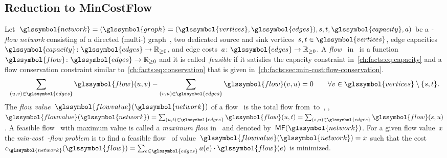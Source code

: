 \subsection{Reduction to MinCostFlow}
\label{ch:facts:sec:model-mincost-flow}
%
Let~$
\glssymbol{network} 
= (
\glssymbol{graph} = (\glssymbol{vertices},\glssymbol{edges}), 
\source, 
\sink, 
\glssymbol{capacity},
\edgeCost)
$ be a \emph{\source-\sink flow network} consisting of a directed
\mbox{(multi-)} graph~, two dedicated source and sink
vertices~$\source, \sink \in \glssymbol{vertices}$, edge capacities $
\glssymbol{capacity}\colon
\glssymbol{edges} 
\to 
\posreals$, and edge costs~$
\edgeCost 
\colon 
\glssymbol{edges} 
\to 
\posreals$. A \emph{flow}~ in~ is a
function~$\glssymbol{flow} \colon \glssymbol{edges} \to
\posreals$ and it is called~\emph{feasible} if it satisfies the capacity
constraint in~\cref{ch:facts:eq:capacity} and a flow conservation constraint
similar to~\cref{ch:facts:eq:conservation} that is given
in~\cref{ch:facts:sec:min-cost:flow-conservation}.
% 
\begin{equation}%
    \sum_{(\vertexa, \vertexb) \in \glssymbol{edges}} 
    \glssymbol{flow} ( \vertexa, \vertexb ) 
    - 
    \sum_{(\vertexb, \vertexa) \in \glssymbol{edges}} 
    \glssymbol{flow}(\vertexb, \vertexa) 
    = 
    0 
    \qquad \forall
    \vertexb \in \glssymbol{vertices} 
    \setminus 
    \{ \source, \sink \}.
    \label{ch:facts:sec:min-cost:flow-conservation}
\end{equation}
% 
The \emph{flow value}~$\glssymbol{flowvalue}(\glssymbol{network})$ of a
flow~ is the total flow from~\source to~\sink, \ie,
$
\glssymbol{flowvalue}(\glssymbol{network}) 
=
\sum_{(\vertexa, \sink) \in \glssymbol{edges}} 
\glssymbol{flow}(\vertexa, \sink) 
= 
\sum_{ (\source, \vertexa) \in \glssymbol{edges}} 
\glssymbol{flow} (\source, \vertexa)
$. A feasible flow~ with maximum value is called a \emph{maximum
flow} in~ and denoted by~$\mf(\glssymbol{network})$. For a
given flow value~$x$ the \emph{min-cost~\source-\sink flow problem} is to find a
feasible flow~ of
value~$\glssymbol{flowvalue}(\glssymbol{network}) = x$ such that the
cost~$
c_{\glssymbol{network}}(\glssymbol{flow}) 
= 
\sum_{\edge \in \glssymbol{edges}}
\edgeCost(\edge) 
\cdot 
\glssymbol{flow}(\edge)$ is minimized.
%
\begingroup
